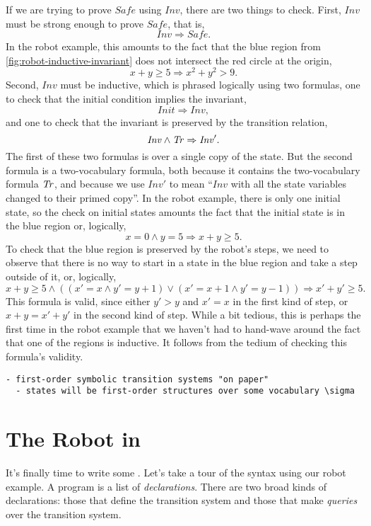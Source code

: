 If we are trying to prove $\mathit{Safe}$ using $\mathit{Inv}$,
  there are two things to check. 
First, $\mathit{Inv}$ must be strong enough 
  to prove $\mathit{Safe}$, 
  that is,
\[
  \mathit{Inv} \Rightarrow \mathit{Safe}.
\]
In the robot example, this amounts to the fact that 
  the blue region from \cref{fig:robot-inductive-invariant}
  does not intersect the red circle at the origin, 
\[
  x + y \ge 5 \Rightarrow x^2 + y^2 > 9.
\]
Second, $\mathit{Inv}$ must be inductive, 
  which is phrased logically using two formulas,
one to check that the initial condition implies the invariant,
\[
  \mathit{Init} \Rightarrow \mathit{Inv},
\]
and one to check that the invariant is preserved by the transition relation,
\[
  \mathit{Inv} \land \mathit{Tr} \Rightarrow \mathit{Inv}'.
\]
The first of these two formulas is over a single copy of the state.
But the second formula is a two-vocabulary formula, 
  both because it contains the two-vocabulary formula $\mathit{Tr}$,
  and because we use $\mathit{Inv}'$ to mean ``$\mathit{Inv}$ 
  with all the state variables changed to their primed copy''. 
In the robot example, there is only one initial state, 
  so the check on initial states amounts the fact that
  the initial state is in the blue region
  or, logically,
\[
  x = 0 \land y = 5 \Rightarrow x + y \ge 5.
\]
To check that the blue region is preserved by the robot's steps,
  we need to observe that there is no way to start in a state in the blue region
  and take a step outside of it, 
  or, logically,
\[
  x + y \ge 5 \land ((x' = x \land y' = y + 1) \lor 
                     (x' = x + 1 \land y' = y - 1)) \Rightarrow 
  x' + y' \ge 5.
\]
This formula is valid, since 
  either $y' > y$ and $x' = x$ in the first kind of step, 
  or $x + y = x' + y'$ in the second kind of step.
While a bit tedious, this is perhaps the first time in the robot example 
  that we haven't had to hand-wave around 
  the fact that one of the regions is inductive.
It follows from the tedium of checking this formula's validity.

\begin{verbatim}
- first-order symbolic transition systems "on paper"
  - states will be first-order structures over some vocabulary \sigma
\end{verbatim}

\section{The Robot in \mypyvy}

It's finally time to write some \mypyvy.
Let's take a tour of the syntax using our robot example.
A \mypyvy program is a list of \emph{declarations}.
There are two broad kinds of declarations:
  those that define the transition system
  and those that make \emph{queries} over the transition system.


